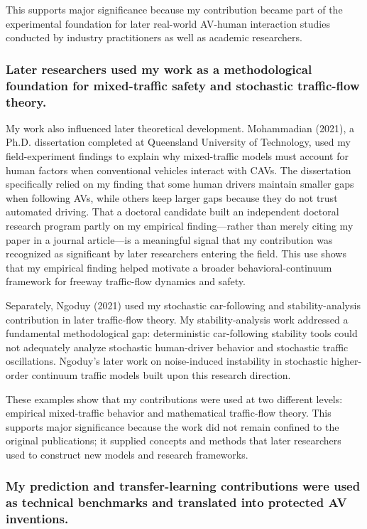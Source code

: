 \documentclass[11pt,letterpaper]{article}
\begin{document}
This supports major significance because my contribution became part of the experimental foundation for later real-world AV-human interaction studies conducted by industry practitioners as well as academic researchers.

\subsubsection{Later researchers used my work as a methodological foundation for mixed-traffic safety and stochastic traffic-flow theory.}

My work also influenced later theoretical development. Mohammadian (2021), a Ph.D. dissertation completed at Queensland University of Technology, used my field-experiment findings to explain why mixed-traffic models must account for human factors when conventional vehicles interact with CAVs. The dissertation specifically relied on my finding that some human drivers maintain smaller gaps when following AVs, while others keep larger gaps because they do not trust automated driving. That a doctoral candidate built an independent doctoral research program partly on my empirical finding---rather than merely citing my paper in a journal article---is a meaningful signal that my contribution was recognized as significant by later researchers entering the field. This use shows that my empirical finding helped motivate a broader behavioral-continuum framework for freeway traffic-flow dynamics and safety.

Separately, Ngoduy (2021) used my stochastic car-following and stability-analysis contribution in later traffic-flow theory. My stability-analysis work addressed a fundamental methodological gap: deterministic car-following stability tools could not adequately analyze stochastic human-driver behavior and stochastic traffic oscillations. Ngoduy's later work on noise-induced instability in stochastic higher-order continuum traffic models built upon this research direction.

These examples show that my contributions were used at two different levels: empirical mixed-traffic behavior and mathematical traffic-flow theory. This supports major significance because the work did not remain confined to the original publications; it supplied concepts and methods that later researchers used to construct new models and research frameworks.

\subsubsection{My prediction and transfer-learning contributions were used as technical benchmarks and translated into protected AV inventions.}
\end{document}
